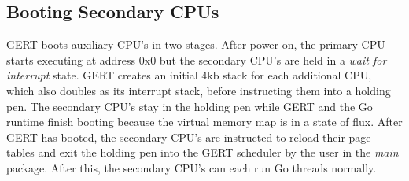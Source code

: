 \subsection{Booting Secondary CPUs}

GERT boots auxiliary CPU's in two stages. After power on, the primary CPU starts executing at address 0x0 but the
secondary CPU's are held in a \textit{wait for interrupt} state. GERT creates an initial 4kb stack for each additional CPU,
which also doubles as its interrupt stack, before instructing them into a holding pen. The secondary CPU's
stay in the holding pen while GERT and the Go runtime finish booting because the virtual memory map is
in a state of flux. After GERT has booted, the secondary CPU's are instructed to reload their page tables
and exit the holding pen into the GERT scheduler by the user in the \textit{main} package. After this, the secondary CPU's
can each run Go threads normally.


